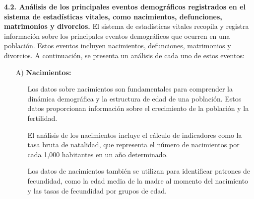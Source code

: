 \documentclass[8pt,a4paper]{beamer}
\begin{document}
{\begin{frame}{}
\begin{block}{\textbf{4.2. Análisis de los principales eventos demográficos registrados en el sistema de estadísticas vitales, como nacimientos, defunciones, matrimonios y divorcios.}}
\justifying
El sistema de estadísticas vitales recopila y registra información sobre los principales eventos demográficos que ocurren en una población. Estos eventos incluyen nacimientos, defunciones, matrimonios y divorcios. A continuación, se presenta un análisis de cada uno de estos eventos:
\begin{enumerate}
\item[A)] \textbf{Nacimientos:}
\begin{itemize}
\justifying
\item[\ding{75}] Los datos sobre nacimientos son fundamentales para comprender la dinámica demográfica y la estructura de edad de una población. Estos datos proporcionan información sobre el crecimiento de la población y la fertilidad.
\item[\ding{75}] El análisis de los nacimientos incluye el cálculo de indicadores como la tasa bruta de natalidad, que representa el número de nacimientos por cada 1,000 habitantes en un año determinado.
\item[\ding{75}] Los datos de nacimientos también se utilizan para identificar patrones de fecundidad, como la edad media de la madre al momento del nacimiento y las tasas de fecundidad por grupos de edad.
\end{itemize}

\end{enumerate}
\end{block}
\end{frame}

\begin{frame}{}
\begin{block}{}
\justifying


\end{block}
\end{frame}}
\end{document}
